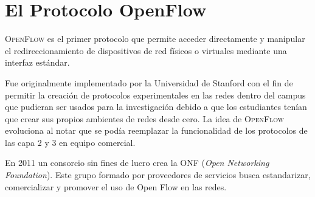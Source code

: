 \documentclass[10pt,journal,compsoc]{IEEEtran}
\begin{document}

 








\section{El Protocolo OpenFlow}
\textsc{OpenFlow} es el primer protocolo que permite acceder directamente y manipular el redireccionamiento de dispositivos de red físicos o virtuales mediante una interfaz estándar. 

Fue originalmente implementado por la Universidad de Stanford con el fin de permitir la creación de protocolos experimentales en las redes dentro del campus que pudieran ser usados para la investigación debido a que los estudiantes tenían que crear sus propios ambientes de redes desde cero. La idea de \textsc{OpenFlow} evoluciona al notar que se podía reemplazar la funcionalidad de los protocolos de las capa 2 y 3 en equipo comercial. 

En 2011 un consorcio sin fines de lucro crea la ONF (\emph{Open Networking Foundation}). Este grupo formado por proveedores de servicios busca estandarizar, comercializar y promover el uso de Open Flow en las redes. 
\end{document}
